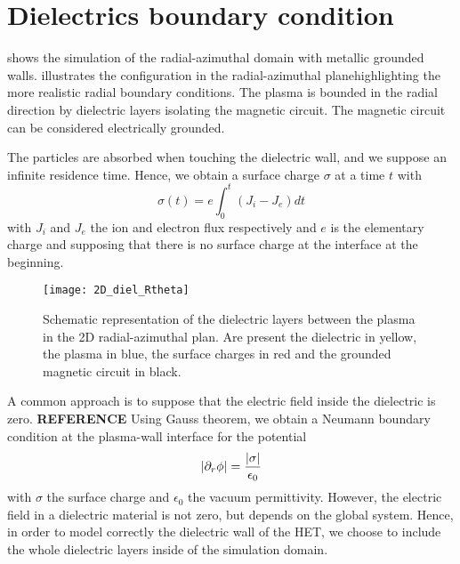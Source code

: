 
\section{Dielectrics boundary condition}
  \label{sec-diel}

   shows the simulation of the radial-azimuthal domain with metallic grounded walls.
   illustrates the configuration in the radial-azimuthal planehighlighting the more realistic radial boundary conditions.
  The plasma is bounded in the radial direction by dielectric layers isolating the magnetic circuit.
  The magnetic circuit can be considered electrically grounded.

  The particles are absorbed when touching the dielectric wall, and we suppose an infinite residence time.
  Hence, we obtain a surface charge $\sigma$ at a time $t$ with
  \begin{equation} \label{eq-sigmaintegrate}
    \sigma(t) = e \int_0^t (J_i - J_e) dt
  \end{equation}
  with $J_i$ and $J_e$ the ion and electron flux respectively and $e$ is the elementary charge and supposing that there is no surface charge at the interface at the beginning.

  \begin{figure}[hbtp]
    \centering
    \texttt{[image: 2D\_diel\_Rtheta]}
    \caption{Schematic representation of the dielectric layers between the plasma in the \ac{2D} radial-azimuthal plan. Are present the dielectric in yellow, the plasma in blue, the surface charges in red and the grounded magnetic circuit in black.}
    \label{fig-2D}
  \end{figure}


  A common approach is to suppose that the electric field inside the dielectric is zero. {\bf REFERENCE}
  Using Gauss theorem, we obtain a Neumann boundary condition at the plasma-wall interface for the potential
  \begin{equation} \label{eq-gauss}
    \lvert\partial_r \phi\rvert = \frac{\lvert\sigma\rvert}{\epsilon_0}
  \end{equation}
  with $\sigma$ the surface charge and $\epsilon_0$ the vacuum permittivity.
  However, the electric field in a dielectric material is not zero, but depends on the global system.
  Hence, in order to model correctly the dielectric wall of the \ac{HET}, we choose to include the whole dielectric layers inside of the simulation domain.

